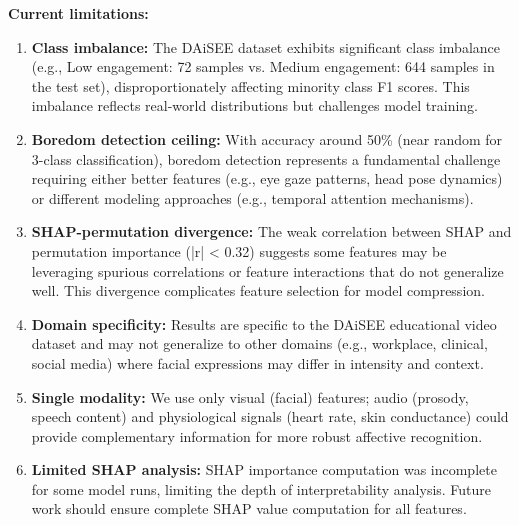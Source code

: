 \textbf{Current limitations:}
\begin{enumerate}
    \item \textbf{Class imbalance:} The DAiSEE dataset exhibits significant class imbalance (e.g., Low engagement: 72 samples vs. Medium engagement: 644 samples in the test set), disproportionately affecting minority class F1 scores. This imbalance reflects real-world distributions but challenges model training.

    \item \textbf{Boredom detection ceiling:} With accuracy around 50\% (near random for 3-class classification), boredom detection represents a fundamental challenge requiring either better features (e.g., eye gaze patterns, head pose dynamics) or different modeling approaches (e.g., temporal attention mechanisms).

    \item \textbf{SHAP-permutation divergence:} The weak correlation between SHAP and permutation importance (|r| < 0.32) suggests some features may be leveraging spurious correlations or feature interactions that do not generalize well. This divergence complicates feature selection for model compression.

    \item \textbf{Domain specificity:} Results are specific to the DAiSEE educational video dataset and may not generalize to other domains (e.g., workplace, clinical, social media) where facial expressions may differ in intensity and context.

    \item \textbf{Single modality:} We use only visual (facial) features; audio (prosody, speech content) and physiological signals (heart rate, skin conductance) could provide complementary information for more robust affective recognition.
    
    \item \textbf{Limited SHAP analysis:} SHAP importance computation was incomplete for some model runs, limiting the depth of interpretability analysis. Future work should ensure complete SHAP value computation for all features.
\end{enumerate}

